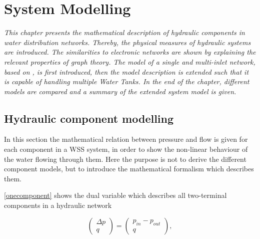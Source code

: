 \chapter{System Modelling}
\label{system_modelling}

\emph{This chapter presents the mathematical description of hydraulic components in water distribution networks. Thereby, the physical measures of hydraulic systems are introduced. The similarities to electronic networks are shown by explaining the relevant properties of graph theory. The model of a single and multi-inlet network, based on \cite{oneinput_paper}, is first introduced, then the model description is extended such that it is capable of handling multiple Water Tanks. In the end of the chapter, different models are compared and a summary of the extended system model is given.}

\section{Hydraulic component modelling}
\label{hydraulic_component_modelling}

In this section the mathematical relation between pressure and flow is given for each component in a WSS system, in order to show the non-linear behaviour of the water flowing through them. Here the purpose is not to derive the different component models, but to introduce the mathematical formalism which describes them.

\eqref{onecomponent} shows the dual variable which describes all two-terminal components in a hydraulic network 

\begin{equation}
\label{onecomponent}
 \begin{pmatrix}
    \Delta p \\
    q
\end{pmatrix}
=
 \begin{pmatrix}
    p_{in} - p_{out} \\
    q
\end{pmatrix},
\end{equation}



